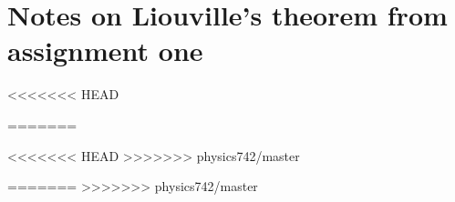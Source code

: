 \section{Notes on Liouville's theorem from assignment one}
<<<<<<< HEAD

=======

%






<<<<<<< HEAD
>>>>>>> physics742/master

=======
>>>>>>> physics742/master
